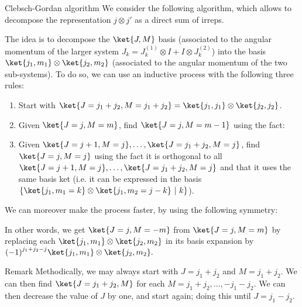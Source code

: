 \documentclass[a4paper]{article}
\begin{document}
\begin{parag}{Clebsch-Gordan algorithm}
    We consider the following algorithm, which allows to decompose the representation $j \otimes j'$ as a direct sum of irreps.

    The idea is to decompose the $\ket{J, M}$ basis (associated to the angular momentum of the larger system $J_k = J_k^{\left(1\right)} \otimes I + I \otimes J_k^{\left(2\right)}$) into the basis $\ket{j_1, m_1} \otimes \ket{j_2, m_2}$ (associated to the angular momentum of the two sub-systems). To do so, we can use an inductive process with the following three rules:
    \begin{enumerate}
        \item Start with $\ket{J = j_1 + j_2, M = j_1 + j_2} = \ket{j_1, j_1} \otimes \ket{j_2, j_2}$.
        \item Given $\ket{J = j, M = m}$, find $\ket{J = j, M = m - 1}$ using the fact:
        \item Given $\ket{J = j+1, M = j}, \ldots, \ket{J = j_1 + j_2, M = j}$, find $\ket{J = j, M = j}$ using the fact it is orthogonal to all $\ket{J = j+1, M = j}, \ldots, \ket{J = j_1 + j_2, M = j}$ and that it uses the same basis ket (i.e. it can be expressed in the basis $\left\{\ket{j_1, m_1 = k} \otimes \ket{j_1, m_2 = j - k} \suchthat k \right\}$).
    \end{enumerate}

    We can moreover make the process faster, by using the following symmetry: 

    In other words, we get $\ket{J=j, M=-m}$ from $\ket{J=j, M=m}$ by replacing each $\ket{j_1, m_1} \otimes \ket{j_2, m_2}$ in its basis expansion by $\left(-1\right)^{j_1 + j_2 - j} \ket{j_1, m_1} \otimes \ket{j_2, m_2}.$

    \begin{subparag}{Remark}
        Methodically, we may always start with $J = j_1 + j_2$ and $M = j_1 + j_2$. We can then find $\ket{J = j_1 + j_2, M}$ for each $M = j_1 + j_2, \ldots, -j_1 - j_2$. We can then decrease the value of $J$ by one, and start again; doing this until $J = j_1 - j_2$.
    \end{subparag}


\end{parag}
\end{document}
